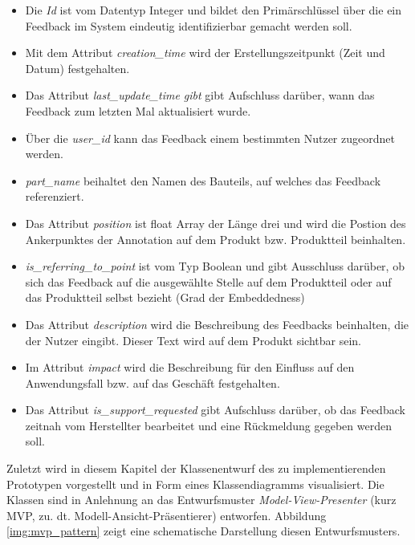 \begin{itemize}
\item{Die \textit{Id} ist vom Datentyp Integer und bildet den Primärschlüssel über die ein Feedback im System eindeutig identifizierbar gemacht werden soll.}
\item{Mit dem Attribut \textit{creation\_time} wird der Erstellungszeitpunkt (Zeit und Datum) festgehalten.}
\item{Das Attribut \textit{last\_update\_time gibt} gibt Aufschluss darüber, wann das Feedback zum letzten Mal aktualisiert wurde.}
\item{Über die \textit{user\_id} kann das Feedback einem bestimmten Nutzer zugeordnet werden.}
\item{\textit{part\_name} beihaltet den Namen des Bauteils, auf welches das Feedback referenziert.}
\item{Das Attribut \textit{position} ist float Array der Länge drei und wird die Postion des Ankerpunktes der Annotation auf dem Produkt bzw. Produktteil beinhalten.}
\item{\textit{is\_referring\_to\_point} ist vom Typ Boolean und gibt Ausschluss darüber, ob sich das Feedback auf die ausgewählte Stelle auf dem Produktteil oder auf das Produktteil selbst bezieht (Grad der Embeddedness)}
\item{Das Attribut \textit{description} wird die Beschreibung des Feedbacks beinhalten, die der Nutzer eingibt. Dieser Text wird auf dem Produkt sichtbar sein.}
\item{Im Attribut \textit{impact} wird die Beschreibung für den Einfluss auf den Anwendungsfall bzw. auf das Geschäft festgehalten.}
\item{Das Attribut \textit{is\_support\_requested} gibt Aufschluss darüber, ob das Feedback zeitnah vom Herstellter bearbeitet und eine Rückmeldung gegeben werden soll.}
\end{itemize}

Zuletzt wird in diesem Kapitel der Klassenentwurf des zu implementierenden Prototypen vorgestellt und in Form eines Klassendiagramms visualisiert.  
Die Klassen sind in Anlehnung an das Entwurfsmuster \textit{Model-View-Presenter} (kurz MVP, zu. dt. Modell-Ansicht-Präsentierer) entworfen. 
Abbildung \ref{img:mvp_pattern} zeigt eine schematische Darstellung diesen Entwurfsmusters. 


